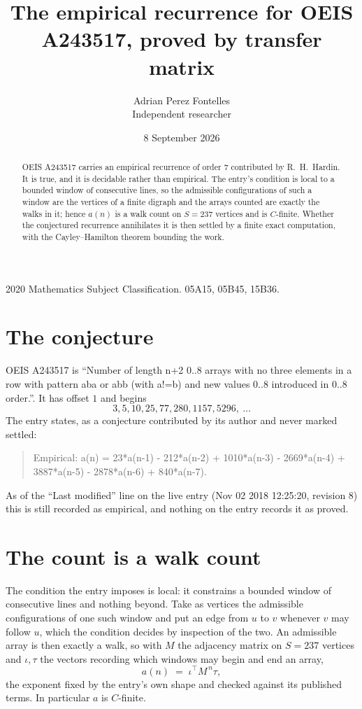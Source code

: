 \documentclass[11pt,a4paper]{article}
\title{The empirical recurrence for OEIS A243517, proved by transfer matrix}
\author{Adrian Perez Fontelles\\ \small Independent researcher}
\date{8 September 2026}
\theoremstyle{plain}
\theoremstyle{definition}
\begin{document}
\maketitle

\begin{abstract}
OEIS A243517 carries an empirical recurrence of order $7$ contributed by R.~H.~Hardin. It is
true, and it is decidable rather than empirical. The entry's condition is local to a bounded window of consecutive lines, so
the admissible configurations of such a window are the vertices of a finite digraph and the
arrays counted are exactly the walks in it; hence $a(n)$ is a walk count on $S=237$ vertices
and is $C$-finite. Whether the conjectured recurrence annihilates it is then settled by a
finite exact computation, with the Cayley--Hamilton theorem bounding the work.
\end{abstract}

\noindent\small 2020 Mathematics Subject Classification. 05A15, 05B45, 15B36.\normalsize

\section{The conjecture}

OEIS A243517 is ``Number of length n+2 0..8 arrays with no three elements in a row with pattern aba or abb (with a!=b) and new values 0..8 introduced in 0..8 order.''. It has offset $1$ and begins
\[
3, 5, 10, 25, 77, 280, 1157, 5296,\ \dots
\]
The entry states, as a conjecture contributed by its author and never marked settled:
\begin{quote}
Empirical: a(n) = 23*a(n-1) - 212*a(n-2) + 1010*a(n-3) - 2669*a(n-4) + 3887*a(n-5) - 2878*a(n-6) + 840*a(n-7).
\end{quote}
As of the ``Last modified'' line on the live entry (Nov 02 2018 12:25:20, revision 8) this is still
recorded as empirical, and nothing on the entry records it as proved.

\section{The count is a walk count}

The condition the entry imposes is local: it constrains a bounded window of consecutive lines and nothing beyond. Take as
vertices the admissible configurations of one such window and put an edge from $u$ to $v$
whenever $v$ may follow $u$, which the condition decides by inspection of the two. An
admissible array is then exactly a walk, so with $M$ the adjacency matrix on $S=237$ vertices
and $\iota,\tau$ the vectors recording which windows may begin and end an array,
\[
a(n)\;=\;\iota^{\!\top}M^{\,n}\tau ,
\]
the exponent fixed by the entry's own shape and checked against its published terms. In
particular $a$ is $C$-finite.
\end{document}
